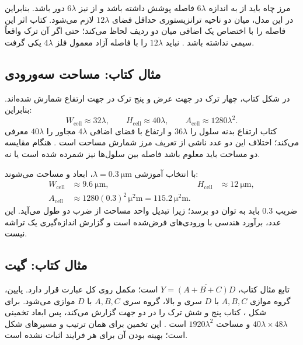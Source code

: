 مرز چاه باید از  به اندازه \(6\lambda\) فاصله پوشش داشته باشد
و از  نیز \(6\lambda\) دور باشد. بنابراین در این مدل،
میان دو ناحیه ترانزیستوری حداقل فضای \(12\lambda\) لازم می‌شود.
کتاب اثر این فاصله را با اختصاص یک  اضافی میان دو ردیف لحاظ می‌کند؛
حتی اگر آن ترک واقعاً سیمی نداشته باشد
\cite[شکل‌های  و ]{weste}.
نباید \(12\lambda\) را با فاصله آزاد معمول فلز \(4\lambda\) یکی گرفت.

\subsection{مثال کتاب: مساحت  سه‌ورودی}
در شکل  کتاب، چهار ترک در جهت عرض و پنج ترک در جهت ارتفاع
شمارش شده‌اند. بنابراین:
\begin{equation*}
W_{\mathrm{cell}}\approx32\lambda,\qquad
H_{\mathrm{cell}}\approx40\lambda,\qquad
A_{\mathrm{cell}}\approx1280\lambda^2.
\end{equation*}
کتاب ارتفاع بدنه سلول را \(36\lambda\) و ارتفاع با فضای اضافی
\(4\lambda\) مجاور را \(40\lambda\) معرفی می‌کند؛
اختلاف این دو عدد ناشی از تعریف مرز شمارش مساحت است
\cite[صفحات چاپی ۲۷ تا ۲۹]{weste}.
هنگام مقایسه دو مساحت باید معلوم باشد فاصله بین سلول‌ها نیز شمرده شده است یا نه.

با انتخاب آموزشی \(\lambda=\qty{0.3}{\micro\metre}\)، ابعاد و مساحت می‌شوند:
\begin{align*}
W_{\mathrm{cell}}&\approx\qty{9.6}{\micro\metre},&
H_{\mathrm{cell}}&\approx\qty{12}{\micro\metre},\\
A_{\mathrm{cell}}&\approx1280(0.3)^2\,\unit{\square\micro\metre}
=\qty{115.2}{\square\micro\metre}.
\end{align*}
ضریب \(0.3\) باید به توان دو برسد؛ زیرا تبدیل واحد مساحت از ضرب دو طول می‌آید.
این عدد، برآورد هندسی با ورودی‌های فرض‌شده است و گزارش اندازه‌گیری یک تراشه نیست.

\subsection{مثال کتاب: گیت }
تابع مثال  کتاب،
\(Y=\overline{(A+B+C)D}\) است؛ مکمل روی کل عبارت قرار دارد.
پایین، گروه موازی \(A,B,C\) با \(D\) سری و بالا، گروه سری \(A,B,C\)
با \(D\) موازی می‌شود.
برای شکل ، کتاب پنج و شش ترک را در دو جهت گزارش می‌کند،
پس ابعاد تخمینی \(40\lambda\times48\lambda\) و مساحت
\(1920\lambda^2\) است \cite[صفحه چاپی ۲۹]{weste}.
این تخمین برای همان ترتیب و مسیرهای شکل است؛ بهینه بودن آن برای هر فرایند اثبات نشده است.

